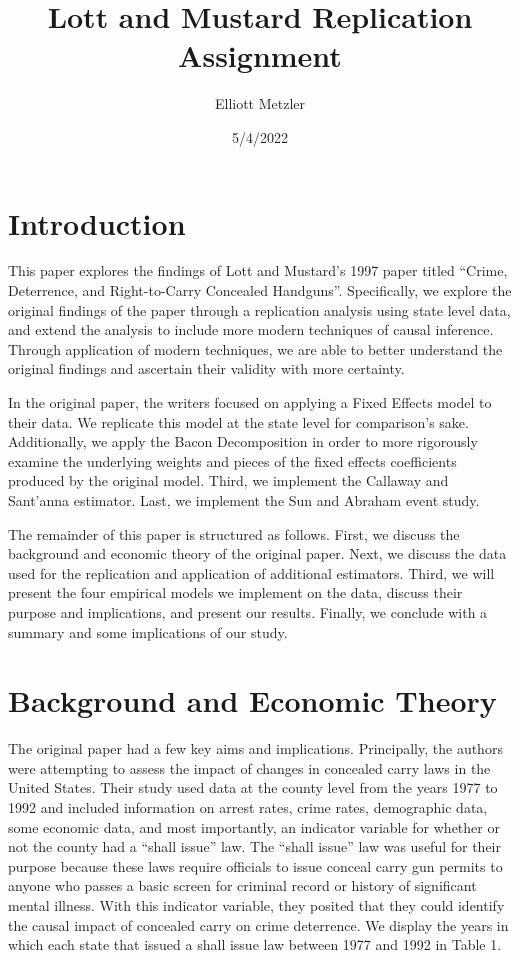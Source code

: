 \documentclass{article}
\author{Elliott Metzler}
\title{Lott and Mustard Replication Assignment}
\date{5/4/2022}
\begin{document}
\maketitle

\section{Introduction}

This paper explores the findings of Lott and Mustard's 1997 paper titled ``Crime, Deterrence, and Right-to-Carry Concealed Handguns''. Specifically, we explore the original findings of the paper through a replication analysis using state level data, and extend the analysis to include more modern techniques of causal inference. Through application of modern techniques, we are able to better understand the original findings and ascertain their validity with more certainty. 

In the original paper, the writers focused on applying a Fixed Effects model to their data. We replicate this model at the state level for comparison's sake. Additionally, we apply the Bacon Decomposition in order to more rigorously examine the underlying weights and pieces of the fixed effects coefficients produced by the original model. Third, we implement the Callaway and Sant'anna estimator. Last, we implement the Sun and Abraham event study. 

The remainder of this paper is structured as follows. First, we discuss the background and economic theory of the original paper. Next, we discuss the data used for the replication and application of additional estimators. Third, we will present the four empirical models we implement on the data, discuss their purpose and implications, and present our results. Finally, we conclude with a summary and some implications of our study.

\section{Background and Economic Theory}

The original paper had a few key aims and implications. Principally, the authors were attempting to assess the impact of changes in concealed carry laws in the United States. Their study used data at the county level from the years 1977 to 1992 and included information on arrest rates, crime rates, demographic data, some economic data, and most importantly, an indicator variable for whether or not the county had a ``shall issue'' law. The ``shall issue'' law was useful for their purpose because these laws require officials to issue conceal carry gun permits to anyone who passes a basic screen for criminal record or history of significant mental illness. With this indicator variable, they posited that they could identify the causal impact of concealed carry on crime deterrence. We display the years in which each state that issued a shall issue law between 1977 and 1992 in Table 1.
\end{document}
